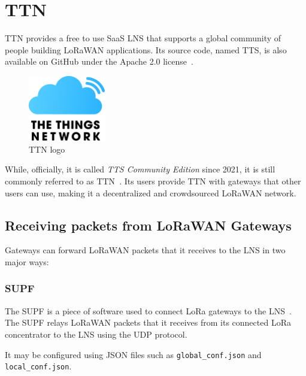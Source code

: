 \section{\acf{TTN}}

\ac{TTN} provides a free to use \ac{SaaS} \ac{LNS} that supports a global community of people building \ac{LoRaWAN} applications.
Its source code, named \ac{TTS}, is also available on GitHub under the Apache 2.0 license~\cite{the_things_network_thethingsnetworklorawan-stack_2023}.

\begin{figure}[htbp]
    \centering
    \includegraphics[width=0.3\textwidth]{pictures/logos/TTN-logo.eps}
    \caption{\acf{TTN} logo~\protect\cite{the_things_industries_bv_quick_nodate}}
\end{figure}


While, officially, it is called \emph{\acl{TTS} Community Edition} since 2021, it is still commonly referred to as \acf{TTN}~\cite{the_things_industries_bv_what_2022}.
Its users provide \ac{TTN} with gateways that other users can use, making it a decentralized and crowdsourced \ac{LoRaWAN} network.

\subsection{Receiving packets from \acs{LoRaWAN} Gateways}

Gateways can forward \ac{LoRaWAN} packets that it receives to the \ac{LNS} in two major ways:

\subsubsection{\acf{SUPF}}

The \ac{SUPF} is a piece of software used to connect \ac{LoRa} gateways to the \ac{LNS}~\cite{the_things_industries_bv_semtech_2022}.
The \ac{SUPF} relays \ac{LoRaWAN} packets that it receives from its connected \ac{LoRa} concentrator to the \ac{LNS} using the \ac{UDP} protocol.

It may be configured using JSON files such as \lstinline{global_conf.json} and \lstinline{local_conf.json}.

